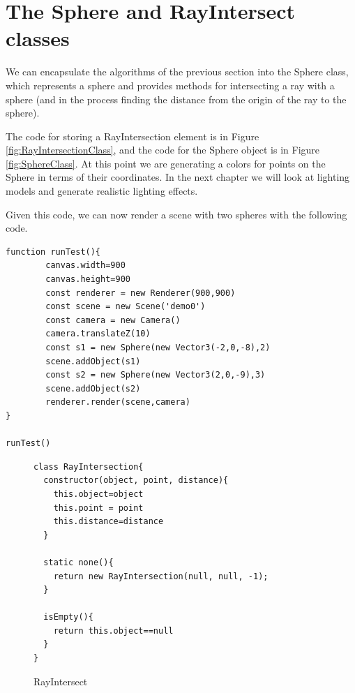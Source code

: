 \documentclass{book}
\begin{document}
\section{The Sphere and RayIntersect classes}
We can encapsulate the algorithms of the previous section into the Sphere
class, which represents a sphere and provides methods for intersecting
a ray with a sphere (and in the process finding the distance from the origin
of the ray to the sphere).

The code for storing a RayIntersection element is in 
Figure \ref{fig:RayIntersectionClass}, and the code for the Sphere object is in
Figure \ref{fig:SphereClass}.  At this point we are generating a colors for points on the Sphere in terms of their coordinates. In the next chapter we will look at lighting models and generate realistic lighting effects.





Given this code, we can now render a scene with two spheres
with the following code.
\begin{verbatim}
function runTest(){
        canvas.width=900
        canvas.height=900
        const renderer = new Renderer(900,900)
        const scene = new Scene('demo0')
        const camera = new Camera()
        camera.translateZ(10)
        const s1 = new Sphere(new Vector3(-2,0,-8),2)
        scene.addObject(s1)
        const s2 = new Sphere(new Vector3(2,0,-9),3)
        scene.addObject(s2)
        renderer.render(scene,camera)
}

runTest()
\end{verbatim}



\begin{figure}
\begin{verbatim}
class RayIntersection{
  constructor(object, point, distance){
    this.object=object
    this.point = point
    this.distance=distance
  }

  static none(){
    return new RayIntersection(null, null, -1);
  }

  isEmpty(){
    return this.object==null
  }
}
\end{verbatim}
\caption{RayIntersect \label{fig:RayIntersectClass}}
\end{figure}
\end{document}
